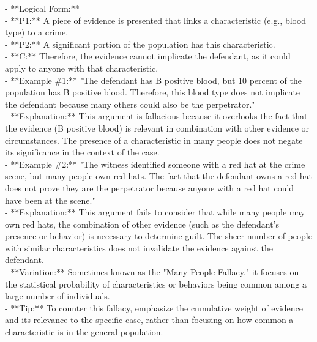 \documentclass[a4paper,12pt,single,pdftex]{scrbook}
\begin{document}
    
      - **Logical Form:**
    \\

    
        - **P1:** A piece of evidence is presented that links a characteristic (e.g., blood type) to a crime.
    \\

    
        - **P2:** A significant portion of the population has this characteristic.
    \\

    
        - **C:** Therefore, the evidence cannot implicate the defendant, as it could apply to anyone with that characteristic.
    \\

    
      - **Example \#1:** "The defendant has B positive blood, but 10 percent of the population has B positive blood. Therefore, this blood type does not implicate the defendant because many others could also be the perpetrator."
    \\

    
      - **Explanation:** This argument is fallacious because it overlooks the fact that the evidence (B positive blood) is relevant in combination with other evidence or circumstances. The presence of a characteristic in many people does not negate its significance in the context of the case.
    \\

    
      - **Example \#2:** "The witness identified someone with a red hat at the crime scene, but many people own red hats. The fact that the defendant owns a red hat does not prove they are the perpetrator because anyone with a red hat could have been at the scene."
    \\

    
      - **Explanation:** This argument fails to consider that while many people may own red hats, the combination of other evidence (such as the defendant's presence or behavior) is necessary to determine guilt. The sheer number of people with similar characteristics does not invalidate the evidence against the defendant.
    \\

    
      - **Variation:** Sometimes known as the "Many People Fallacy," it focuses on the statistical probability of characteristics or behaviors being common among a large number of individuals.
    \\

    
      - **Tip:** To counter this fallacy, emphasize the cumulative weight of evidence and its relevance to the specific case, rather than focusing on how common a characteristic is in the general population.
    \\
\end{document}
